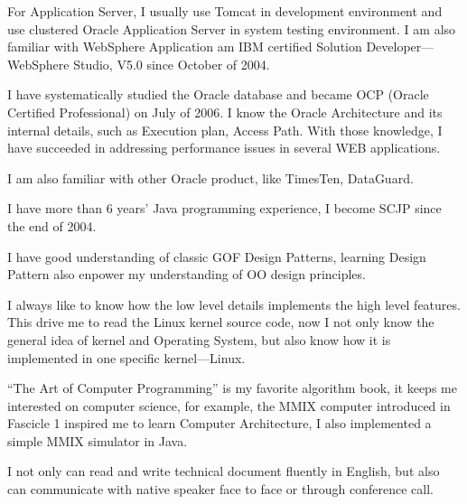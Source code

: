 For Application Server, I usually use Tomcat in development environment and use clustered Oracle
Application Server in system testing environment. I am also familiar with WebSphere Application
am IBM certified Solution Developer---WebSphere Studio, V5.0 since October of 2004.


\par
I have systematically studied the Oracle database and became OCP 
(Oracle Certified Professional) on July of 2006. 
I know the Oracle Architecture and its 
internal details, such as Execution plan, Access Path.
With those knowledge, I have succeeded in addressing performance issues in
several WEB applications. 

I am also familiar with other Oracle product, like TimesTen, DataGuard.


\par
I have more than 6 years' Java programming experience, I become SCJP since the 
end of 2004. 

I have good understanding of classic GOF Design Patterns, learning
Design Pattern also enpower my understanding of OO design principles.

\par
I always like to know how the low level details implements the high level features.
This drive me to read the Linux kernel source code, now I not only know the general 
idea of kernel and Operating System, but also know how it is implemented 
in one specific kernel---Linux.




\par
``The Art of Computer Programming'' is my favorite algorithm book, it keeps me 
interested on computer science, for example, the MMIX computer introduced in 
Fascicle 1 inspired me to learn Computer Architecture, I also implemented a 
simple MMIX simulator in Java. 



    

\par
I not only can read and write technical document fluently in English, 
but also can communicate with native speaker face to face or through 
conference call.

